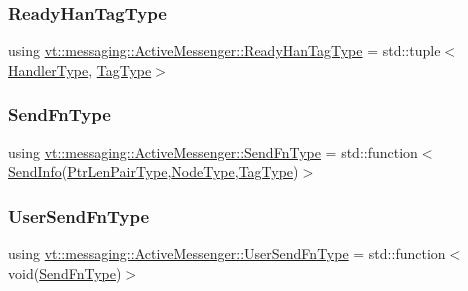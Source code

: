 \subsubsection{\texorpdfstring{Ready\+Han\+Tag\+Type}{ReadyHanTagType}}
{\footnotesize\ttfamily using \hyperlink{structvt_1_1messaging_1_1_active_messenger_a98bb74aa4a561161dd7c7073dcd5f1d3}{vt\+::messaging\+::\+Active\+Messenger\+::\+Ready\+Han\+Tag\+Type} =  std\+::tuple$<$\hyperlink{namespacevt_af64846b57dfcaf104da3ef6967917573}{Handler\+Type}, \hyperlink{namespacevt_a84ab281dae04a52a4b243d6bf62d0e52}{Tag\+Type}$>$}

\mbox{\label{structvt_1_1messaging_1_1_active_messenger_a09efd64a8c1bc26a7333c70b76ca01bd}} 
\subsubsection{\texorpdfstring{Send\+Fn\+Type}{SendFnType}}
{\footnotesize\ttfamily using \hyperlink{structvt_1_1messaging_1_1_active_messenger_a09efd64a8c1bc26a7333c70b76ca01bd}{vt\+::messaging\+::\+Active\+Messenger\+::\+Send\+Fn\+Type} =  std\+::function$<$\hyperlink{structvt_1_1messaging_1_1_send_info}{Send\+Info}(\hyperlink{namespacevt_a97f320a1d3b9b4035e591671cd7d10f0}{Ptr\+Len\+Pair\+Type},\hyperlink{namespacevt_a866da9d0efc19c0a1ce79e9e492f47e2}{Node\+Type},\hyperlink{namespacevt_a84ab281dae04a52a4b243d6bf62d0e52}{Tag\+Type})$>$}

\mbox{\label{structvt_1_1messaging_1_1_active_messenger_a4b1993ad77436b6ed6c7fd32801c50ed}} 
\subsubsection{\texorpdfstring{User\+Send\+Fn\+Type}{UserSendFnType}}
{\footnotesize\ttfamily using \hyperlink{structvt_1_1messaging_1_1_active_messenger_a4b1993ad77436b6ed6c7fd32801c50ed}{vt\+::messaging\+::\+Active\+Messenger\+::\+User\+Send\+Fn\+Type} =  std\+::function$<$void(\hyperlink{structvt_1_1messaging_1_1_active_messenger_a09efd64a8c1bc26a7333c70b76ca01bd}{Send\+Fn\+Type})$>$}




